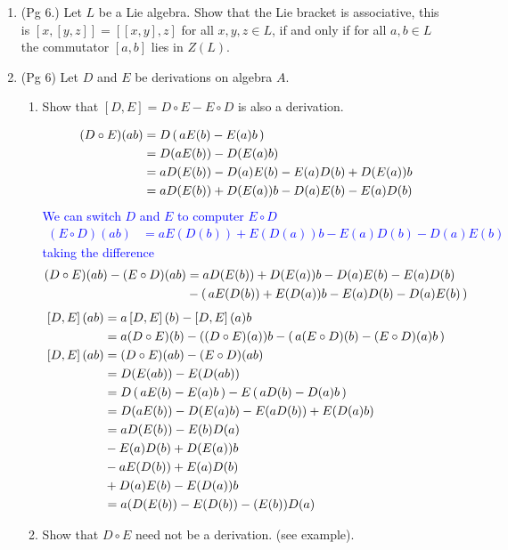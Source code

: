 \documentclass[12pt,a4paper]{report}
\newcommand{\BLUE}[1]{\textcolor{blue}{#1}}
\newcommand{\LB}[2]{\left [ #1,#2 \right ]}
\begin{document}
\begin{enumerate}[label=\textit{1.\arabic*}]
\item (Pg 6.) Let $L$ be a Lie algebra.  Show that the Lie bracket is associative, this is $\LB{x}{\LB{y}{z}} = \LB{\LB{x}{y}}{z}$ for all $x,y,z \in L$, if and only if for all $a,b \in L$ the commutator $[a,b]$ lies in $Z(L)$.

\item (Pg 6) Let $D$ and $E$ be derivations on algebra $A$.
\begin{enumerate}[label=(\roman*)]
	\item Show that $\LB{D}{E}=D \circ E-E\circ D$ is also a derivation.
	
	\BLUE{\begin{align*}
		(D \circ E)(ab) &= D\left (\, aE(b)-E(a)b \,\right ) \\
		&=D(aE(b))-D(E(a)b)\\
		&= aD(E(b))-D(a)E(b)-E(a)D(b)+D(E(a))b \\
		&= aD(E(b))+D(E(a))b-D(a)E(b)-E(a)D(b) 
	\end{align*}We can switch $D$ and $E$ to computer $E \circ D$
	\begin{align*}
		(E\circ D)(ab) &= aE(D(b))+E(D(a))b-E(a)D(b)-D(a)E(b) 
	\end{align*}taking the difference
	\begin{align*}
		(D \circ E)(ab)-(E\circ D)(ab) &= aD(E(b))+D(E(a))b-D(a)E(b)-E(a)D(b) \\&-\left (\, aE(D(b))+E(D(a))b-E(a)D(b)-D(a)E(b) \,\right )
	\end{align*}
	\begin{align*}
		\LB{D}{E}(ab) &=a\LB{D}{E}(b)-\LB{D}{E}(a)b \\
		&= a(D \circ E)(b)-((D\circ E)(a))b -\PAREN{a(E\circ D)(b)-(E\circ D)(a)b}\\
		\LB{D}{E}(ab) &= (D \circ E)(ab)-(E\circ D)(ab) \\
		&= D(E(ab))-E(D(ab))\\
		&= D\PAREN{aE(b)-E(a)b}-E\PAREN{aD(b)-D(a)b} \\
		&= D(aE(b))-D(E(a)b)-E(aD(b))+E(D(a)b) \\
		&= aD(E(b))-E(b)D(a)\\&-E(a)D(b)+D(E(a))b\\&-aE(D(b))+E(a)D(b)\\&+D(a)E(b)-E(D(a))b\\
		&= a(D(E(b))-E(D(b))-(E(b))D(a)
	\end{align*}
	}
	
	\item Show that $D\circ E$ need not be a derivation.  (see example).


\end{enumerate}
\end{enumerate}
\end{document}
